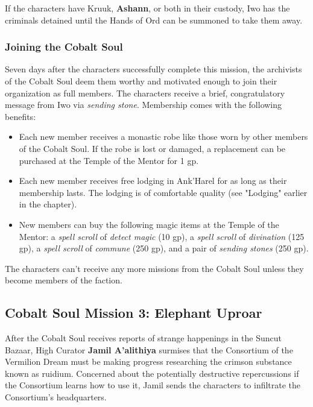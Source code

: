 \documentclass[letterpaper, 11pt, bg=full, twocolumn]{dndbook}
\begin{document}
If the characters have Kruuk, \textbf{Ashann}, or both in their custody, Iwo has the criminals detained until the Hands of Ord can be summoned to take them away.

\subsubsection{Joining the Cobalt Soul}

Seven days after the characters successfully complete this mission, the archivists of the Cobalt Soul deem them worthy and motivated enough to join their organization as full members. The characters receive a brief, congratulatory message from Iwo via \textit{sending stone}. Membership comes with the following benefits:

\begin{itemize}
\item Each new member receives a monastic robe like those worn by other members of the Cobalt Soul. If the robe is lost or damaged, a replacement can be purchased at the Temple of the Mentor for 1 gp.
\item Each new member receives free lodging in Ank'Harel for as long as their membership lasts. The lodging is of comfortable quality (see "Lodging" earlier in the chapter).
\item New members can buy the following magic items at the Temple of the Mentor: a \textit{spell scroll} of \textit{detect magic} (10 gp), a \textit{spell scroll} of \textit{divination} (125 gp), a \textit{spell scroll} of \textit{commune} (250 gp), and a pair of \textit{sending stones} (250 gp).
\end{itemize}

The characters can't receive any more missions from the Cobalt Soul unless they become members of the faction.

\subsection{Cobalt Soul Mission 3: Elephant Uproar}

After the Cobalt Soul receives reports of strange happenings in the Suncut Bazaar, High Curator \textbf{Jamil A'alithiya} surmises that the Consortium of the Vermilion Dream must be making progress researching the crimson substance known as ruidium. Concerned about the potentially destructive repercussions if the Consortium learns how to use it, Jamil sends the characters to infiltrate the Consortium's headquarters.
\end{document}
